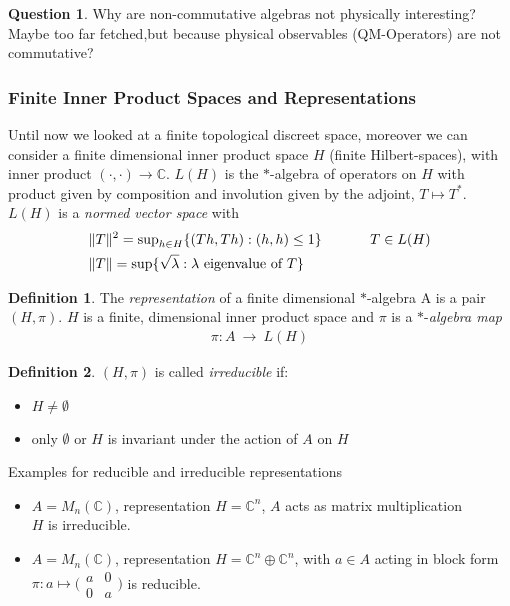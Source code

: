 \documentclass[a4paper]{article}
\theoremstyle{definition}
\newtheorem{definition}{Definition}
\theoremstyle{definition}
\newtheorem{question}{Question}
\theoremstyle{theorem}
\theoremstyle{theorem}
\theoremstyle{definition}
\begin{document}
\begin{question}
    Why are non-commutative algebras not physically interesting?
    Maybe too far fetched,but because physical observables (QM-Operators) are not commutative?
\end{question}

\subsubsection{Finite Inner Product Spaces and Representations}
Until now we looked at a finite topological discreet space, moreover we can consider a
finite dimensional inner product space $H$ (finite Hilbert-spaces), with inner product
$(\cdot,\cdot)\rightarrow \mathbb{C}$. $L(H)$ is the $*$-algebra of operators on $H$
with product given by composition and involution given by the adjoint, $T \mapsto T^*$.
$L(H)$ is a \textit{normed vector space} with
\begin{align*}
    &\|T\|^2 = \text{sup}_{h \in H}\{(Th,Th): (h,h) \leq 1\} \hspace{0.1\textwidth} T \in L(H) \\
    &\|T\| = \text{sup}\{\sqrt{\lambda}: \lambda \text{ eigenvalue of } T\}
\end{align*}


\begin{definition}
    The \textit{representation} of a finite dimensional $*$-algebra A is a pair $(H, \pi)$.
    $H$ is a finite, dimensional inner product space and $\pi$ is a $*$-\textit{algebra map}
    \begin{align*}
        \pi:A\ \rightarrow \ L(H)
    \end{align*}
\end{definition}
\begin{definition}
    $(H, \pi)$ is called \textit{irreducible} if:
    \begin{itemize}
        \item $H \neq \emptyset$
        \item only $\emptyset$ or $H$ is invariant under the action of $A$ on $H$
    \end{itemize}
\end{definition}

Examples for reducible and irreducible representations
\begin{itemize}
    \item $A = M_n(\mathbb{C})$, representation $H=\mathbb{C}^n$, $A$ acts as matrix multiplication\\
            $H$ is irreducible.
    \item $A = M_n(\mathbb{C})$, representation $H=\mathbb{C}^n\oplus \mathbb{C}^n$, with $a \in A$ acting
        in block form \\ $\pi: a \mapsto \big(\begin{smallmatrix} a & 0\\ 0 & a \end{smallmatrix}\big)$ is
            reducible.
\end{itemize}
\end{document}
